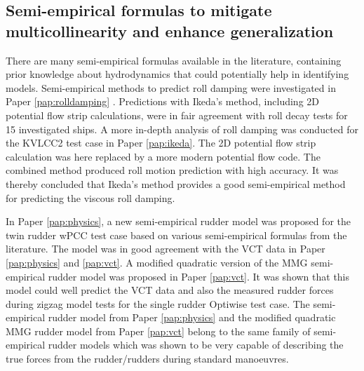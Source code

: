 \subsection*{Semi-empirical formulas to mitigate multicollinearity and enhance generalization}
There are many semi-empirical formulas available in the literature, containing prior knowledge about hydrodynamics that could potentially help in identifying models.       
Semi-empirical methods to predict roll damping were investigated in Paper \ref{pap:rolldamping} . Predictions with Ikeda's method, including 2D potential flow strip calculations, were in fair agreement with roll decay tests for 15 investigated ships. 
A more in-depth analysis of roll damping was conducted for the KVLCC2 test case in Paper \ref{pap:ikeda}. The 2D potential flow strip calculation was here replaced by a more modern potential flow code. The combined method produced roll motion prediction with high accuracy. It was thereby concluded that Ikeda's method provides a good semi-empirical method for predicting the viscous roll damping.

In Paper \ref{pap:physics}, a new semi-empirical rudder model was proposed for the twin rudder wPCC test case based on various semi-empirical formulas from the literature. The model was in good agreement with the VCT data in Paper \ref{pap:physics} and \ref{pap:vct}. 
A modified quadratic version of the MMG semi-empirical rudder model was proposed in Paper \ref{pap:vct}. 
It was shown that this model could well predict the VCT data and also the measured rudder forces during zigzag model tests for the single rudder Optiwise test case. 
The semi-empirical rudder model from Paper \ref{pap:physics} and the modified quadratic MMG rudder model from Paper \ref{pap:vct} belong to the same family of semi-empirical rudder models which was shown to be very capable of describing the true forces from the rudder/rudders during standard manoeuvres.  